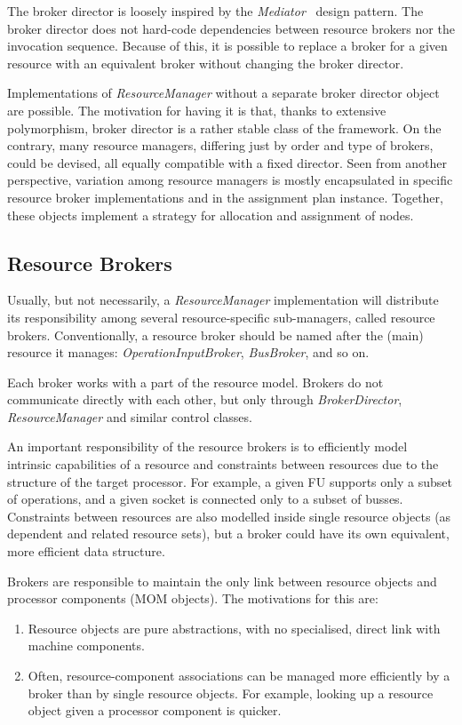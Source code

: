 \documentclass[a4paper,twoside]{tce}
\begin{document}
The broker director is loosely inspired by the
\emph{Mediator}~\cite{DesignPatterns} design pattern. The broker director
does not hard-code dependencies between resource brokers nor the invocation
sequence. Because of this, it is possible to replace a broker for a given
resource with an equivalent broker without changing the broker director.

Implementations of \emph{ResourceManager} without a separate broker director
object are possible. The motivation for having it is that, thanks to
extensive polymorphism, broker director is a rather stable class of the
framework. On the contrary, many resource managers, differing just by order
and type of brokers, could be devised, all equally compatible with a fixed
director.
%
Seen from another perspective, variation among resource managers is mostly
encapsulated in specific resource broker implementations and in the
assignment plan instance. Together, these objects implement a strategy for
allocation and assignment of nodes.

\subsection{Resource Brokers}
\label{ssec:ResourceBroker}

Usually, but not necessarily, a \emph{ResourceManager} implementation will
distribute its responsibility among several resource-specific sub-managers,
called resource brokers. Conventionally, a resource broker should be named
after the (main) resource it manages: \emph{OperationInputBroker},
\emph{BusBroker}, and so on.

Each broker works with a part of the resource model. Brokers do not
communicate directly with each other, but only through
\emph{BrokerDirector}, \emph{ResourceManager} and similar control classes.

An important responsibility of the resource brokers is to efficiently model
intrinsic capabilities of a resource and constraints between resources due
to the structure of the target processor. For example, a given FU supports
only a subset of operations, and a given socket is connected only to a
subset of busses. Constraints between resources are also modelled inside
single resource objects (as dependent and related resource sets), but a
broker could have its own equivalent, more efficient data structure.

Brokers are responsible to maintain the only link between resource objects
and processor components (MOM objects). The motivations for this are:
\begin{enumerate}
\item%
  Resource objects are pure abstractions, with no specialised, direct link
  with machine components.
\item%
  Often, resource-component associations can be managed more efficiently by
  a broker than by single resource objects. For example, looking up a
  resource object given a processor component is quicker.
\end{enumerate}
\end{document}
